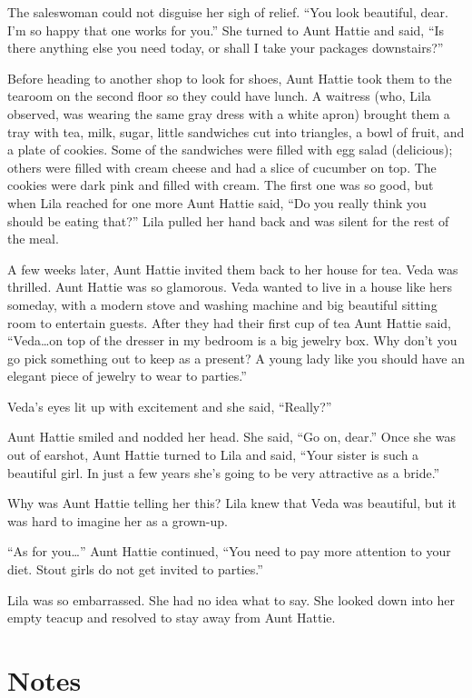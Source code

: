 \documentclass[
  letterpaper,
]{book}
\begin{document}
The saleswoman could not disguise her sigh of relief. ``You look
beautiful, dear. I'm so happy that one works for you.'' She turned to
Aunt Hattie and said, ``Is there anything else you need today, or shall
I take your packages downstairs?''

Before heading to another shop to look for shoes, Aunt Hattie took them
to the tearoom on the second floor so they could have lunch. A waitress
(who, Lila observed, was wearing the same gray dress with a white apron)
brought them a tray with tea, milk, sugar, little sandwiches cut into
triangles, a bowl of fruit, and a plate of cookies. Some of the
sandwiches were filled with egg salad (delicious); others were filled
with cream cheese and had a slice of cucumber on top. The cookies were
dark pink and filled with cream. The first one was so good, but when
Lila reached for one more Aunt Hattie said, ``Do you really think you
should be eating that?'' Lila pulled her hand back and was silent for
the rest of the meal.

A few weeks later, Aunt Hattie invited them back to her house for tea.
Veda was thrilled. Aunt Hattie was so glamorous. Veda wanted to live in
a house like hers someday, with a modern stove and washing machine and
big beautiful sitting room to entertain guests. After they had their
first cup of tea Aunt Hattie said, ``Veda\ldots on top of the dresser in
my bedroom is a big jewelry box. Why don't you go pick something out to
keep as a present? A young lady like you should have an elegant piece of
jewelry to wear to parties.''

Veda's eyes lit up with excitement and she said, ``Really?''

Aunt Hattie smiled and nodded her head. She said, ``Go on, dear.'' Once
she was out of earshot, Aunt Hattie turned to Lila and said, ``Your
sister is such a beautiful girl. In just a few years she's going to be
very attractive as a bride.''

Why was Aunt Hattie telling her this? Lila knew that Veda was beautiful,
but it was hard to imagine her as a grown-up.

``As for you\ldots{}'' Aunt Hattie continued, ``You need to pay more
attention to your diet. Stout girls do not get invited to parties.''

Lila was so embarrassed. She had no idea what to say. She looked down
into her empty teacup and resolved to stay away from Aunt Hattie.

\section{Notes}\label{notes-12}
\end{document}
